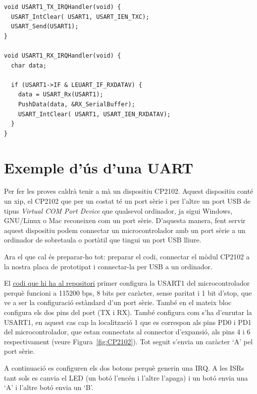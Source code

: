 \begin{lstlisting}[style=customc,caption={ISRs de TX i RX de la UART},label=UARTISRs]
void USART1_TX_IRQHandler(void) {
  USART_IntClear( USART1, USART_IEN_TXC);
  USART_Send(USART1);
}

void USART1_RX_IRQHandler(void) {
  char data;

  if (USART1->IF & LEUART_IF_RXDATAV) {
    data = USART_Rx(USART1);
    PushData(data, &RX_SerialBuffer);
    USART_IntClear( USART1, USART_IEN_RXDATAV);
  }
}
\end{lstlisting}



\section{Exemple d'ús d'una UART}
\label{sub:UART_example}
Per fer les proves caldrà tenir a mà un dispositiu \gls{CP2102}. Aquest dispositiu conté un xip, el CP2102 que per un costat té un port sèrie i per l'altre un port USB de tipus {\em Virtual COM Port Device} que qualsevol ordinador, ja sigui Windows, GNU/Linux o Mac reconeixen com un port sèrie. D'aquesta manera, fent servir aquest dispositiu podem connectar un microcontrolador amb un port sèrie a un ordinador de sobretaula o portàtil que tingui un port \gls{USB} lliure.

Ara el que cal és preparar-ho tot: preparar el codi, connectar el mòdul CP2102 a la nostra placa de prototipat i connectar-la per USB a un ordinador.

El \href{https://github.com/mariusmm/cursembedded/tree/master/Simplicity/UART_1}{codi que hi ha al repositori} primer configura la USART1 del microcontrolador perquè funcioni a 115200 bps, 8 bits per caràcter, sense paritat i 1 bit d'stop, que ve a ser la configuració estàndard d'un port sèrie. També en el mateix bloc configura els dos pins del port (TX i RX). També configura com s'ha d'enrutar la USART1, en aquest cas cap la localització 1 que es correspon als pins PD0 i PD1 del microcontrolador, que estan connectats al connector d'expansió, als pins 4 i 6 respectivament (veure Figura~\ref{fig:CP2102}). Tot seguit s'envia un caràcter ‘A' pel port sèrie.

A continuació es configuren els dos botons perquè generin una \gls{IRQ}. A les \glspl{ISR} tant sols es canvia el LED (un botó l'encén i l'altre l'apaga) i un botó envia una ‘A' i l'altre botó envia un ‘B'.

